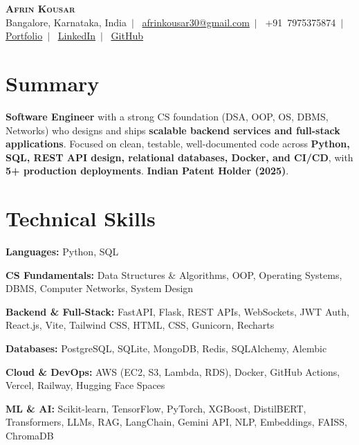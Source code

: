 \documentclass[letterpaper,9pt]{article}
\begin{document}
\begin{center}
  {\LARGE\scshape\textbf{Afrin Kousar}}\\\vspace{3pt}
  \footnotesize
  Bangalore, Karnataka, India~$|$~
  \href{mailto:afrinkousar30@gmail.com}{afrinkousar30@gmail.com}~$|$~
  +91~7975375874~$|$~
  \href{https://afrin-kousar.netlify.app/}{\underline{Portfolio}}~$|$~
  \href{https://linkedin.com/in/afrin-kousar}{\underline{LinkedIn}}~$|$~
  \href{https://github.com/afrin2315}{\underline{GitHub}}
\end{center}
\vspace{-7pt}

\section{Summary}
{\scriptsize
\textbf{Software Engineer} with a strong CS foundation (DSA, OOP, OS, DBMS, Networks) who designs and ships \textbf{scalable backend services and full-stack applications}. Focused on clean, testable, well-documented code across \textbf{Python, SQL, REST API design, relational databases, Docker, and CI/CD}, with \textbf{5+ production deployments}. \textbf{Indian Patent Holder (2025)}.
}

\section{Technical Skills}
\begin{itemize}[leftmargin=0.1in,label={},itemsep=1pt,topsep=2pt,parsep=0pt]
  \scriptsize{
    \item \textbf{Languages:} Python, SQL
    \item \textbf{CS Fundamentals:} Data Structures \& Algorithms, OOP, Operating Systems, DBMS, Computer Networks, System Design
    \item \textbf{Backend \& Full-Stack:} FastAPI, Flask, REST APIs, WebSockets, JWT Auth, React.js, Vite, Tailwind CSS, HTML, CSS, Gunicorn, Recharts
    \item \textbf{Databases:} PostgreSQL, SQLite, MongoDB, Redis, SQLAlchemy, Alembic
    \item \textbf{Cloud \& DevOps:} AWS (EC2, S3, Lambda, RDS), Docker, GitHub Actions, Vercel, Railway, Hugging Face Spaces
    \item \textbf{ML \& AI:} Scikit-learn, TensorFlow, PyTorch, XGBoost, DistilBERT, Transformers, LLMs, RAG, LangChain, Gemini API, NLP, Embeddings, FAISS, ChromaDB
  }
\end{itemize}
\end{document}
